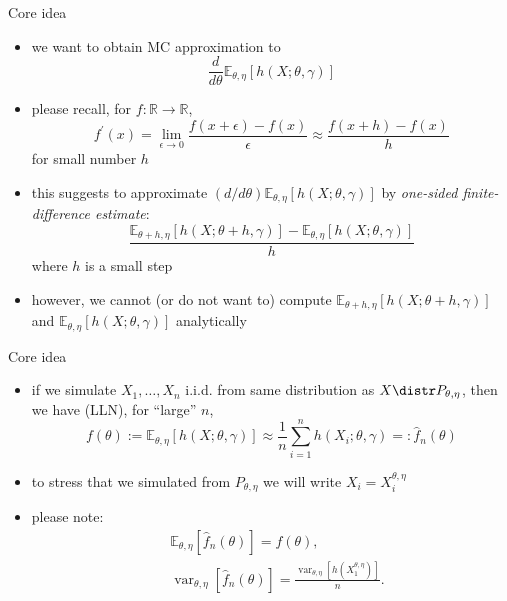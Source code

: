 \documentclass[pdf, handout]{beamer}
\begin{document}
\begin{frame}{Core idea}
\begin{itemize}
\item we want to obtain MC approximation to
$$
\frac{d}{d\theta} \mathbb{E}_{\theta,\eta} [ h(X; \theta, \gamma)]
$$
\item please recall, for $f:\mathbb{R}\to\mathbb{R}$,
\[
f^\prime(x) = \lim_{\epsilon\to 0} \frac{ f(x+\epsilon) - f(x)}{\epsilon}\approx \frac{ f(x+h) - f(x)}{h} %
\]
for small number $h$
\item this suggests to approximate 
$(d/d\theta) \mathbb{E}_{\theta,\eta} [ h(X; \theta, \gamma)]$
by 
\emph{one-sided finite-difference estimate}:
$$
\frac{ \mathbb{E}_{\theta+h,\eta} [ h(X; \theta+h, \gamma)]
-  \mathbb{E}_{\theta,\eta} [ h(X; \theta, \gamma)]
}{h}
$$
where $h$ is a small step
\item 
however, we cannot (or do not want to) compute 
$\mathbb{E}_{\theta+h,\eta} [ h(X; \theta+h, \gamma)]$ and
$\mathbb{E}_{\theta,\eta} [ h(X; \theta, \gamma)]$ analytically
\end{itemize}
\end{frame}

\begin{frame}{Core idea}
\begin{itemize}
\item if we simulate $X_1,\dots,X_n$ i.i.d. from same distribution as $X\distr P_{\theta,\eta}$, then we have (LLN), for ``large'' $n$,
\[
f(\theta):=\mathbb{E}_{\theta,\eta} [ h(X; \theta, \gamma)]
\approx \frac{1}{n}\sum_{i=1}^n h(X_i; \theta,\gamma)=:\hat f_n(\theta)
\]
\item to stress that we simulated from $ P_{\theta,\eta}$
we will write $X_i = X_i^{\theta,\eta}$
\item please note:
\begin{align*}
&\mathbb{E}_{\theta,\eta} [ \hat f_n(\theta) ] = f(\theta), \\
&\operatorname{var}_{\theta,\eta} [ \hat f_n(\theta) ] = 
\frac{ \operatorname{var}_{\theta,\eta}\left[ h\left(X_1^{\theta,\eta}\right)\right]}{n}.
\end{align*}
\end{itemize}
\end{frame}
\end{document}
